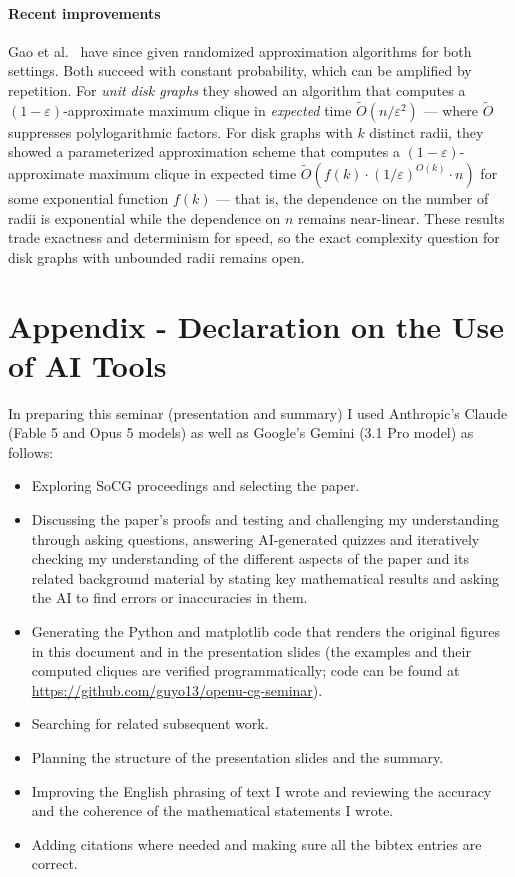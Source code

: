 \documentclass[12pt]{article}
\begin{document}
\paragraph{Recent improvements}
Gao et al.~\cite{gao2026swat} have since given randomized approximation algorithms for both settings.
Both succeed with constant probability, which can be amplified by repetition.
For \textit{unit disk graphs} they showed an algorithm that computes a $(1-\varepsilon)$-approximate maximum clique in \textit{expected} time $\widetilde{O}(n/\varepsilon^2)$ --- where $\widetilde{O}$ suppresses polylogarithmic factors.
For disk graphs with $k$ distinct radii, they showed a parameterized approximation scheme that computes a $(1-\varepsilon)$-approximate maximum clique in expected time
$\widetilde{O}(f(k)\cdot (1/\varepsilon)^{O(k)} \cdot n)$ for some exponential function $f(k)$ --- that is, the dependence on the number of radii is exponential while the dependence on $n$ remains near-linear.
These results trade exactness and determinism for speed, so the exact complexity question for disk graphs with unbounded radii remains open.




\section*{Appendix - Declaration on the Use of AI Tools}\label{sec:ai}
In preparing this seminar (presentation and summary) I used Anthropic's Claude (Fable 5 and Opus 5 models) as well as Google's Gemini (3.1 Pro model) as follows:
\begin{itemize}
  \item Exploring SoCG proceedings and selecting the paper.
  \item Discussing the paper's proofs and testing and challenging my understanding through asking questions, answering AI-generated quizzes and iteratively checking my understanding of the different aspects of the paper and its related background material by stating key mathematical results and asking the AI to find errors or inaccuracies in them.
  \item Generating the Python and matplotlib code that renders the original figures in this document and in the presentation slides (the examples and their computed cliques are verified programmatically; code can be found at \url{https://github.com/guyo13/openu-cg-seminar}).
  \item Searching for related subsequent work.
  \item Planning the structure of the presentation slides and the summary.
  \item Improving the English phrasing of text I wrote and reviewing the accuracy and the coherence of the mathematical statements I wrote.
  \item Adding citations where needed and making sure all the bibtex entries are correct.
\end{itemize}
\end{document}
